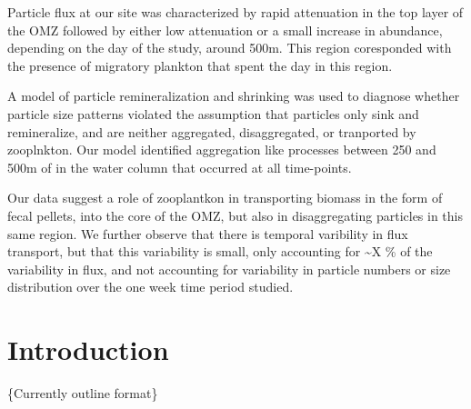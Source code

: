 \documentclass[]{article}
\begin{document}
Particle flux at our site was characterized by rapid attenuation in the
top layer of the OMZ followed by either low attenuation or a small
increase in abundance, depending on the day of the study, around 500m.
This region coresponded with the presence of migratory plankton that
spent the day in this region.

A model of particle remineralization and shrinking was used to diagnose
whether particle size patterns violated the assumption that particles
only sink and remineralize, and are neither aggregated, disaggregated,
or tranported by zooplnkton. Our model identified aggregation like
processes between 250 and 500m of in the water column that occurred at
all time-points.

Our data suggest a role of zooplantkon in transporting biomass in the
form of fecal pellets, into the core of the OMZ, but also in
disaggregating particles in this same region. We further observe that
there is temporal varibility in flux transport, but that this
variability is small, only accounting for \textasciitilde{}X \% of the
variability in flux, and not accounting for variability in particle
numbers or size distribution over the one week time period studied.

\hypertarget{introduction}{%
\section{Introduction}\label{introduction}}

\{Currently outline format\}
\end{document}
